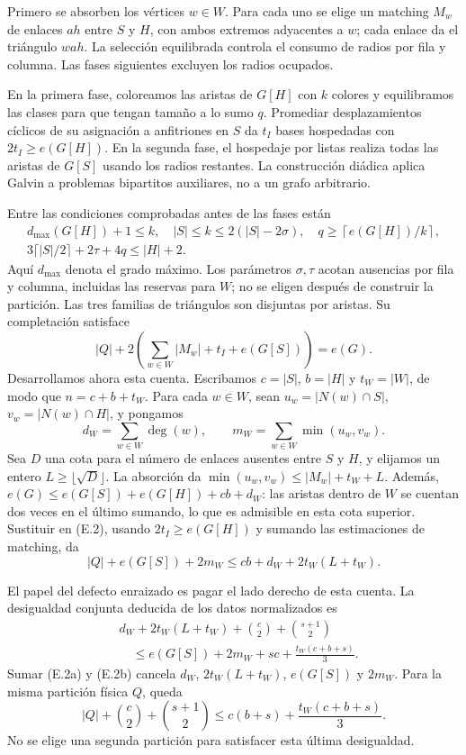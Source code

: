 \documentclass[spanish,11pt,a4paper]{article}
\begin{document}
Primero se absorben los vértices \(w\in W\). Para cada uno se elige un matching \(M_w\) de enlaces \(ah\) entre \(S\) y \(H\), con ambos extremos adyacentes a \(w\); cada enlace da el triángulo \(wah\). La selección equilibrada controla el consumo de radios por fila y columna. Las fases siguientes excluyen los radios ocupados.

En la primera fase, coloreamos las aristas de \(G[H]\) con \(k\) colores y equilibramos las clases para que tengan tamaño a lo sumo \(q\). Promediar desplazamientos cíclicos de su asignación a anfitriones en \(S\) da \(t_I\) bases hospedadas con \(2t_I\ge e(G[H])\). En la segunda fase, el hospedaje por listas realiza todas las aristas de \(G[S]\) usando los radios restantes. La construcción diádica aplica Galvin a problemas bipartitos auxiliares, no a un grafo arbitrario.

Entre las condiciones comprobadas antes de las fases están \[
\begin{gathered}
d_{\max}(G[H])+1\le k,\quad |S|\le k\le2(|S|-2\sigma),\quad
q\ge\left\lceil e(G[H])/k\right\rceil,\\
3\lceil|S|/2\rceil+2\tau+4q\le |H|+2.
\end{gathered}
\tag{E.1}
\] Aquí \(d_{\max}\) denota el grado máximo. Los parámetros \(\sigma,\tau\) acotan ausencias por fila y columna, incluidas las reservas para \(W\); no se eligen después de construir la partición. Las tres familias de triángulos son disjuntas por aristas. Su completación satisface \[
|Q|+2\left(\sum_{w\in W}|M_w|+t_I+e(G[S])\right)=e(G).
\tag{E.2}
\] Desarrollamos ahora esta cuenta. Escribamos \(c=|S|\), \(b=|H|\) y \(t_W=|W|\), de modo que \(n=c+b+t_W\). Para cada \(w\in W\), sean \(u_w=|N(w)\cap S|\), \(v_w=|N(w)\cap H|\), y pongamos \[
d_W=\sum_{w\in W}\deg(w),\qquad
m_W=\sum_{w\in W}\min(u_w,v_w).
\] Sea \(D\) una cota para el número de enlaces ausentes entre \(S\) y \(H\), y elijamos un entero \(L\ge\lfloor\sqrt D\rfloor\). La absorción da \(\min(u_w,v_w)\le |M_w|+t_W+L\). Además, \(e(G)\le e(G[S])+e(G[H])+cb+d_W\): las aristas dentro de \(W\) se cuentan dos veces en el último sumando, lo que es admisible en esta cota superior. Sustituir en (E.2), usando \(2t_I\ge e(G[H])\) y sumando las estimaciones de matching, da \[
|Q|+e(G[S])+2m_W\le cb+d_W+2t_W(L+t_W).
\tag{E.2a}
\]

El papel del defecto enraizado es pagar el lado derecho de esta cuenta. La desigualdad conjunta deducida de los datos normalizados es \[
\begin{split}
&d_W+2t_W(L+t_W)+\binom c2+\binom{s+1}2\\
&\hspace{1em}\le e(G[S])+2m_W+sc+\frac{t_W(c+b+s)}3.
\end{split}
\tag{E.2b}
\] Sumar (E.2a) y (E.2b) cancela \(d_W\), \(2t_W(L+t_W)\), \(e(G[S])\) y \(2m_W\). Para la misma partición física \(Q\), queda \[
|Q|+\binom c2+\binom{s+1}2
\le c(b+s)+\frac{t_W(c+b+s)}3.
\tag{E.2c}
\] No se elige una segunda partición para satisfacer esta última desigualdad.
\end{document}
